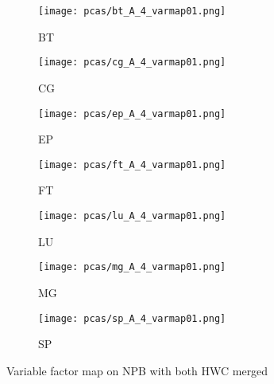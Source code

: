 \begin{figure}
    \label{fig:pca_results}
    \begin{subfigure}[b]{0.3\textwidth}
        \texttt{[image: pcas/bt\_A\_4\_varmap01.png]}
        \caption{BT}
        \label{fig:bt_pcv_hwc1}
    \end{subfigure}
    \quad
    \begin{subfigure}[b]{0.3\textwidth}
        \texttt{[image: pcas/cg\_A\_4\_varmap01.png]}
        \caption{CG}
        \label{fig:cg_pcv_hwc1}
    \end{subfigure}
    \quad
    \begin{subfigure}[b]{0.3\textwidth}
        \texttt{[image: pcas/ep\_A\_4\_varmap01.png]}
        \caption{EP}
        \label{fig:ep_pcv_hwc1}
    \end{subfigure}
    
    \begin{subfigure}[b]{0.3\textwidth}
        \texttt{[image: pcas/ft\_A\_4\_varmap01.png]}
        \caption{FT}
        \label{fig:ft_pcv_hwc1}
    \end{subfigure}
    \quad
    \begin{subfigure}[b]{0.3\textwidth}
        \texttt{[image: pcas/lu\_A\_4\_varmap01.png]}
        \caption{LU}
        \label{fig:lu_pcv_hwc1}
    \end{subfigure}
    \quad
    \begin{subfigure}[b]{0.3\textwidth}
        \texttt{[image: pcas/mg\_A\_4\_varmap01.png]}
        \caption{MG}
        \label{fig:mg_pcv_hwc1}
    \end{subfigure}

    \begin{subfigure}[b]{0.3\textwidth}
        \texttt{[image: pcas/sp\_A\_4\_varmap01.png]}
        \caption{SP}
        \label{fig:sp_pcv_hwc1}
    \end{subfigure}
    \caption{Variable factor map on NPB with both HWC merged}
\end{figure}


